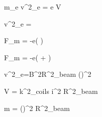 

\large {} m_{e} v^{2}_{e} = e V 


\large v^{2}_{e} = 


\large \lvert F_{m} \rvert = \lvert -e( \times {}) \rvert 


\large \lvert F_{m} \rvert = \lvert -e(\vec{\varepsilon} +  \times {}) \rvert 


\large v^{2}_{e}=B^{2}R^{2}_{beam} ()^{2}


\large V =  k^{2}_{coils} i^{2} R^{2}_{beam} 

\large m =  ()^{2} R^{2}_{beam} 
